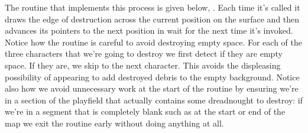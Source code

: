The routine that implements this process is given below,
. Each time it's called it draws the edge of
destruction across the current position on the surface and then advances its pointers
to the next position in wait for the next time it's invoked.
Notice how the routine is careful to avoid destroying empty space. For each of the
three characters that we're going to destroy we first detect if they are empty space. If they
are, we skip to the next character. This avoids the displeasing possibility of appearing to 
add destroyed debris to the empty background. 
Notice also how we avoid unnecessary work at the start of the routine by ensuring we're in
a section of the playfield that actually contains some dreadnought to destroy: if we're in a segment
that is completely blank such as at the start or end of the map we exit the routine early without doing anything at all.

